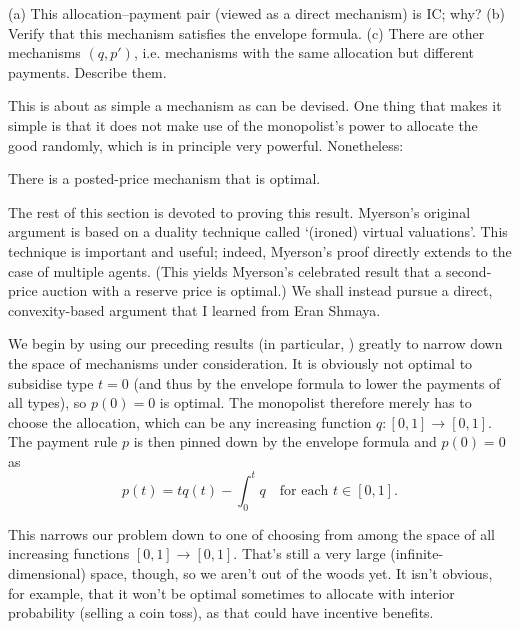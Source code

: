 \begin{exercise}
	\label{exercise:posted_price}
	(a) This allocation--payment pair (viewed as a direct mechanism) is IC; why?
	(b) Verify that this mechanism satisfies the envelope formula.
	(c) There are other mechanisms $(q,p')$, i.e. mechanisms with the same allocation but different payments. Describe them.
\end{exercise}

This is about as simple a mechanism as can be devised.
One thing that makes it simple is that it does not make use of the monopolist's power to allocate the good randomly, which is in principle very powerful.
Nonetheless:

\begin{theorem}
	\label{theorem:Myerson}
	There is a posted-price mechanism that is optimal.
\end{theorem}

The rest of this section is devoted to proving this result.
Myerson's original argument is based on a duality technique called `(ironed) virtual valuations'. This technique is important and useful; indeed, Myerson's proof directly extends to the case of multiple agents. (This yields Myerson's celebrated result that a second-price auction with a reserve price is optimal.)
We shall instead pursue a direct, convexity-based argument that I learned from Eran Shmaya.

We begin by using our preceding results (in particular, ) greatly to narrow down the space of mechanisms under consideration.
It is obviously not optimal to subsidise type $t=0$ (and thus by the envelope formula to lower the payments of all types), so $p(0)=0$ is optimal.
The monopolist therefore merely has to choose the allocation, which can be any increasing function $q : [0,1] \to [0,1]$.
The payment rule $p$ is then pinned down by the envelope formula and $p(0)=0$ as
%
\begin{equation*}
	p(t)
	= t q(t) - \int_0^t q 
	\quad \text{for each $t \in [0,1]$.}
\end{equation*}

This narrows our problem down to one of choosing from among the space of all increasing functions $[0,1] \to [0,1]$.
That's still a very large (infinite-dimensional) space, though, so we aren't out of the woods yet.
It isn't obvious, for example, that it won't be optimal sometimes to allocate with interior probability (selling a coin toss), as that could have incentive benefits.


